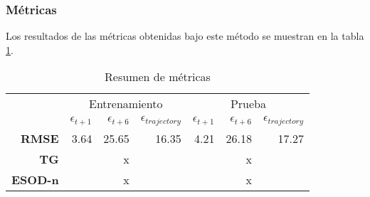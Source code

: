 \subsubsection*{Métricas}

Los resultados de las métricas obtenidas bajo este método se muestran en la tabla \ref{table:M3_metricas_na30}.

\begin{table}[H]
	\centering
	\begin{tabular}{rrrr|rrr}
		\hline \hline
		& \multicolumn{3}{c|}{Entrenamiento} & \multicolumn{3}{c}{Prueba} \\
		& $\epsilon_{t+1}$ & $\epsilon_{t+6}$ &$\epsilon_{trajectory}$ & $\epsilon_{t+1}$  & $\epsilon_{t+6}$ & $\epsilon_{trajectory}$ \\ \hline
		\textbf{RMSE}   & 3.64 & 25.65 & 16.35 & 4.21 & 26.18 & 17.27 \\
		\textbf{TG}     &      & x     &       &      & x     &       \\
		\textbf{ESOD-n} &      & x     &       &      & x     &       \\ 
		\hline \hline
	\end{tabular}
	\caption{Resumen de métricas}
	\label{table:M3_metricas_na30}
\end{table}

